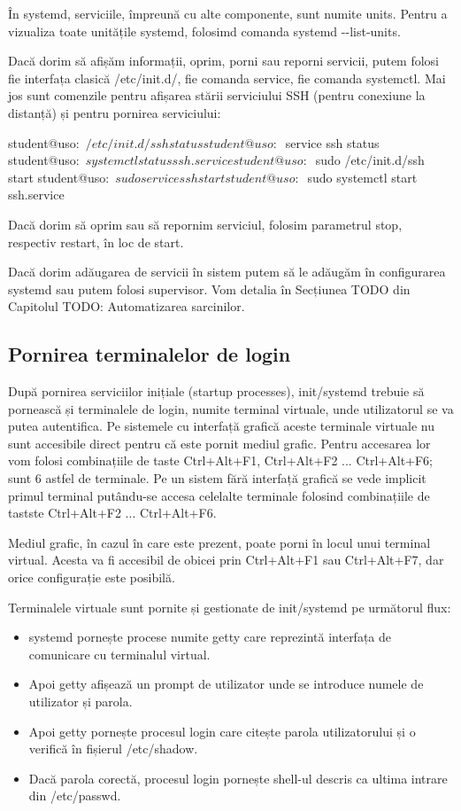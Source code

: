 În systemd, serviciile, împreună cu alte componente, sunt numite units. Pentru a
vizualiza toate unitățile systemd, folosimd comanda systemd -{}-list-units.

Dacă dorim să afișăm informații, oprim, porni sau reporni servicii, putem folosi
fie interfața clasică /etc/init.d/, fie comanda service, fie comanda systemctl.
Mai jos sunt comenzile pentru afișarea stării serviciului SSH (pentru conexiune
la distanță) și pentru pornirea serviciului:

\begin{screen}
student@uso:~$ /etc/init.d/ssh status
student@uso:~$ service ssh status
student@uso:~$ systemctl status ssh.service
student@uso:~$ sudo /etc/init.d/ssh start
student@uso:~$ sudo service ssh start
student@uso:~$ sudo systemctl start ssh.service
\end{screen}

Dacă dorim să oprim sau să repornim serviciul, folosim parametrul stop,
respectiv restart, în loc de start.

Dacă dorim adăugarea de servicii în sistem putem să le adăugăm în configurarea
systemd sau putem folosi supervisor. Vom detalia în Secțiunea TODO din Capitolul
TODO: Automatizarea sarcinilor.

\subsection{Pornirea terminalelor de login}
\label{sec:boot-init-linux-login}

După pornirea serviciilor inițiale (startup processes), init/systemd trebuie să
pornească și terminalele de login, numite terminal virtuale, unde utilizatorul
se va putea autentifica. Pe sistemele cu interfață grafică aceste terminale
virtuale nu sunt accesibile direct pentru că este pornit mediul grafic. Pentru
accesarea lor vom folosi combinațiile de taste Ctrl+Alt+F1, Ctrl+Alt+F2 ...
Ctrl+Alt+F6; sunt 6 astfel de terminale. Pe un sistem fără interfață grafică se
vede implicit primul terminal putându-se accesa celelalte terminale folosind
combinațiile de tastste Ctrl+Alt+F2 ... Ctrl+Alt+F6.

Mediul grafic, în cazul în care este prezent, poate porni în locul unui terminal
virtual. Acesta va fi accesibil de obicei prin Ctrl+Alt+F1 sau Ctrl+Alt+F7, dar
orice configurație este posibilă.

Terminalele virtuale sunt pornite și gestionate de init/systemd pe următorul flux:

\begin{itemize}
	\item systemd pornește procese numite getty care reprezintă interfața de
		comunicare cu terminalul virtual.
	\item Apoi getty afișează un prompt de utilizator unde se introduce
		numele de utilizator și parola.
	\item Apoi getty pornește procesul login care citește parola
		utilizatorului și o verifică în fișierul /etc/shadow.
	\item Dacă parola corectă, procesul login pornește shell-ul descris ca
		ultima intrare din /etc/passwd.
\end{itemize}

